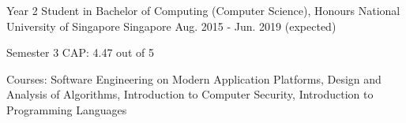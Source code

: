 

\begin{cventries}

	\cventry
	{Year 2 Student in Bachelor of Computing (Computer Science), Honours} %
	{National University of Singapore} %
	{Singapore} %
	{Aug. 2015 - Jun. 2019 (expected)} %
	{
		\begin{cvitems} %
		\item {Semester 3 CAP: 4.47 out of 5}
		\item {Courses: Software Engineering on Modern Application Platforms, Design and Analysis of Algorithms, Introduction to Computer Security, Introduction to Programming Languages}
		\end{cvitems}
	}

\end{cventries}
